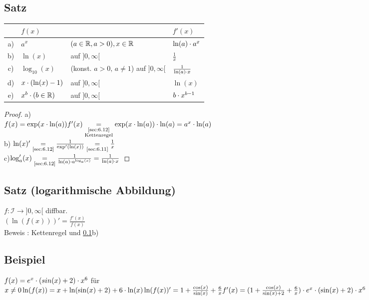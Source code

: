 \subsection[Satz:]{Satz}\label{sec:6.14}
\begin{tabular}{cll|l}
	& $f(x)$ & & $f'(x)$\\
	\hline
	a) & $a^x$ & $(a \in \mathbb{R}, a> 0), x\in \mathbb{R}$ & $\ln(a) \cdot a^x$\\
	b) & $\ln(x)$ & auf $]0,\infty[$ & $\frac{1}{x}$\\
	c) & $\log_{10}(x)$ & (konst. $a > 0,\, a \ne 1$) auf $]0,\infty[$ & $\frac{1}{\ln(a) \cdot x}$\\
	d) & $x \cdot (\ln(x) -1 )$ & auf $]0,\infty[$ & $\ln(x)$\\
	e) & $x^b \cdot (b \in \mathbb{R})$& auf $]0,\infty[ $ & $b \cdot x^{b-1}$ 
\end{tabular}
\begin{proof}
	a)\\
	$f(x) = \exp(x \cdot \ln(a))\\
	f'(x) \underset{\substack
		{\text{\ref{sec:6.12}}\\\text{Kettenregel}}}{=} \exp(x \cdot \ln(a)) \cdot \ln(a) = a^x \cdot \ln(a)$\\
	b) $\ln(x)'  \underset{\text{\ref{sec:6.12}}}{=} \frac{1}{\exp'(\ln(x))} \underset{\text{\ref{sec:6.11}}}{=} \frac{1}{x}$\\
	c)$ \log'_a(x) \underset{\text{\ref{sec:6.12}}}{=} \frac{1}{\ln(a) \cdot a^{\log_a(x)}} = \frac{1}{\ln(a) \cdot x}$
\end{proof}
\subsection{Satz (logarithmische Abbildung)}
$f : \mathcal{I} \to ]0,\infty[$ diffbar.\\
$(\ln(f(x)))' = \frac{f'(x)}{f(x)}$\\
Beweis : Kettenregel und \ref{sec:6.14}b)\\
\subsection{Beispiel}
$f(x) = e^x \cdot (sin(x) +2) \cdot x^6$ für $x \ne 0\\
\ln(f(x)) = x + \ln(\sin(x) +2) + 6 \cdot \ln(x)\\
\ln(f(x))' = 1 + \frac{\cos(x)}{\sin(x)} + \frac{6}{x}\\
f'(x) = (1 + \frac{\cos(x)}{\sin(x) + 2} + \frac{6}{x}) \cdot e^x \cdot (\sin(x) + 2) \cdot x^6$\\
